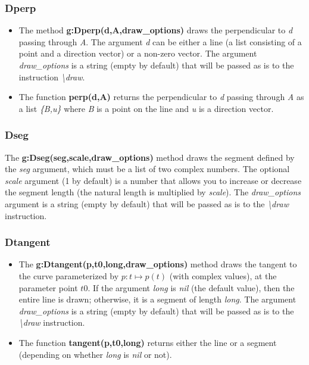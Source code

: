 \subsubsection{Dperp}
\begin{itemize}
    \item The method \textbf{g:Dperp(d,A,draw\_options)} draws the perpendicular to \emph{d} passing through \emph{A}. The argument \emph{d} can be either a line (a list consisting of a point and a direction vector) or a non-zero vector. The argument \emph{draw\_options} is a string (empty by default) that will be passed as is to the instruction \emph{\textbackslash draw}.
    \item The function \textbf{perp(d,A)} returns the perpendicular to \emph{d} passing through \emph{A} as a list \emph{\{B,u\}} where \emph{B} is a point on the line and \emph{u} is a direction vector. \end{itemize}

\subsubsection{Dseg}
The \textbf{g:Dseg(seg,scale,draw\_options)} method draws the segment defined by the \emph{seg} argument, which must be a list of two complex numbers. The optional \emph{scale} argument (1 by default) is a number that allows you to increase or decrease the segment length (the natural length is multiplied by \emph{scale}). The \emph{draw\_options} argument is a string (empty by default) that will be passed as is to the \emph{\textbackslash draw} instruction.

\subsubsection{Dtangent}
\begin{itemize}
    \item The \textbf{g:Dtangent(p,t0,long,draw\_options)} method draws the tangent to the curve parameterized by \(p: t \mapsto p(t)\) (with complex values), at the parameter point \(t0\). If the argument \emph{long} is \emph{nil} (the default value), then the entire line is drawn; otherwise, it is a segment of length \emph{long}. The argument \emph{draw\_options} is a string (empty by default) that will be passed as is to the \emph{\textbackslash draw} instruction.
    \item The function \textbf{tangent(p,t0,long)} returns either the line or a segment (depending on whether \emph{long} is \emph{nil} or not). \end{itemize}


